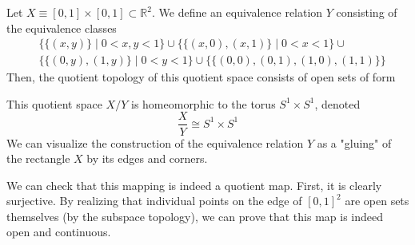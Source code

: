 \documentclass{article}
\begin{document}
    \begin{example}
    Let $X \equiv [0,1] \times [0,1] \subset \mathbb{R}^2$. We define an equivalence relation $Y$ consisting of the equivalence classes
    \begin{align*}
        &\big\{\{(x, y)\} \; | \; 0<x, y<1\big\} \cup \big\{ \{(x, 0), (x,1)\} \; | \; 0<x<1 \big\} \cup \\
        &\big\{ \{(0,y), (1,y)\} \; | \; 0<y<1 \big\} \cup \big\{ \{(0,0), (0,1), (1,0), (1,1)\} \big\}
    \end{align*}
    Then, the quotient topology of this quotient space consists of open sets of form
    \begin{center}
    \end{center}
    This quotient space $X / Y$ is homeomorphic to the torus $S^1 \times S^1$, denoted
    \[\frac{X}{Y} \cong S^1 \times S^1\]
    We can visualize the construction of the equivalence relation $Y$ as a "gluing" of the rectangle $X$ by its edges and corners. 

    We can check that this mapping is indeed a quotient map. First, it is clearly surjective. By realizing that individual points on the edge of $[0,1]^2$ are open sets themselves (by the subspace topology), we can prove that this map is indeed open and continuous. 
    \end{example}
\end{document}
